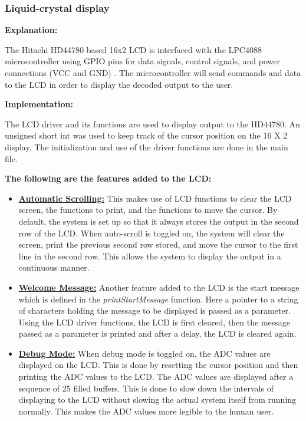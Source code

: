 \documentclass{cce2014-design}
\begin{document}
\subsubsection{Liquid-crystal display}
\textbf{Explanation:}

The Hitachi HD44780-based 16x2 LCD is interfaced with the LPC4088 microcontroller using GPIO pins for data signals, control signals, and power connections (VCC and GND) \cite{hd44780-datasheet}.
The microcontroller will send commands and data to the LCD in order to display the decoded output to the user.

\textbf{Implementation:}

The LCD driver and its functions are used to display output to the HD44780. An unsigned short int was used to keep track of the cursor position on the 16 X 2 display. The initialization and use of the driver functions are done in the main file.

\vspace{1em}
\textbf{The following are the features added to the LCD:}

\begin{itemize}
   \item[{}] \textbf{\underline{Automatic Scrolling:}} This makes use of LCD functions to clear the LCD screen, the functions to print, and the functions to move the cursor. By default, the system is set up so that it always stores the output in the second row of the LCD. When auto-scroll is toggled on, the system will clear the screen, print the previous second row stored, and move the cursor to the first line in the second row. This allows the system to display the output in a continuous manner.
      \vspace{0.5em}
   \item[{}] \textbf{\underline{Welcome Message:}} Another feature added to the LCD is the start message which is defined in the \textit{printStartMessage} function. Here a pointer to a string of characters holding the message to be displayed is passed as a parameter. Using the LCD driver functions, the LCD is first cleared, then the message passed as a parameter is printed and after a delay, the LCD is cleared again.
      \vspace{0.5em}
   \item[{}] \textbf{\underline{Debug Mode:}} When debug mode is toggled on, the ADC values are displayed on the LCD. This is done by resetting the cursor position and then printing the ADC values to the LCD. The ADC values are displayed after a sequence of 25 filled buffers. This is done to slow down the intervals of displaying to the LCD without slowing the actual system itself from running normally. This makes the ADC values more legible to the human user.
\end{itemize}
\end{document}
